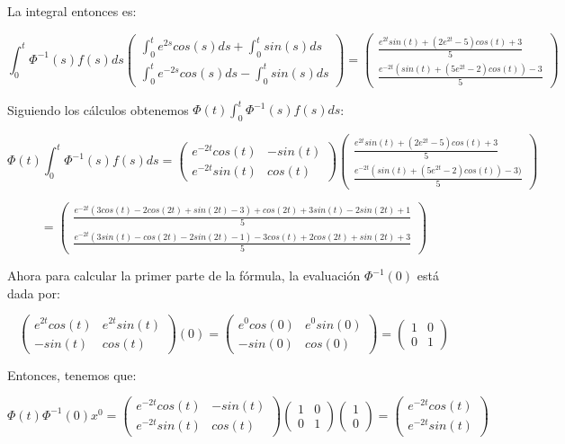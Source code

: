La integral entonces es: 

$$ \int^{t}_{0} \Phi^{-1}(s)f(s) ds \begin{pmatrix}
\int^{t}_{0} e^{2s} cos(s) ds + \int^{t}_{0} sin(s) ds\\
\int^{t}_{0} e^{-2s} cos(s) ds - \int^{t}_{0} sin(s) ds
\end{pmatrix}= 
\begin{pmatrix}
\frac{e^{2t} sin(t)+ (2e^{2t}-5) cos(t)+3}{5}\\
\frac{e^{-2t}(sin(t)+ (5e^{2t}-2)cos(t))-3}{5}
\end{pmatrix}$$

Siguiendo los cálculos obtenemos $\Phi(t) \int^{t}_{0} \Phi^{-1}(s) f(s) ds$: 

$$ \Phi(t) \int^{t}_{0} \Phi^{-1}(s) f(s) ds= \begin{pmatrix}
e^{-2t}cos(t) & -sin(t)\\
e^{-2t}sin(t) & cos(t)
\end{pmatrix}
\begin{pmatrix}
\frac{e^{2t}sin(t)+ (2e^{2t}-5)cos(t)+3}{5}\\
\frac{e^{-2t}(sin(t)+(5e^{2t}-2)cos(t))-3)}{5}
\end{pmatrix}$$

$$=\begin{pmatrix}
\frac{e^{-2t}(3cos(t)-2cos(2t)+sin(2t)-3)+cos(2t)+3sin(t)-2sin(2t)+1}{5}\\
\frac{e^{-2t}(3sin(t)-cos(2t)-2sin(2t)-1)-3cos(t)+2cos(2t)+sin(2t)+3}{5}
\end{pmatrix}$$

Ahora para calcular la primer parte de la fórmula, la evaluación $\Phi^{-1}(0)$ está dada por: 

$$\begin{pmatrix}
e^{2t}cos(t) & e^{2t}sin(t)\\
-sin(t) & cos(t)
\end{pmatrix}(0)=
\begin{pmatrix}
e^{0}cos(0) & e^{0}sin(0)\\
-sin(0) & cos(0)
\end{pmatrix}=
\begin{pmatrix}
1 & 0\\
0 & 1
\end{pmatrix}$$

Entonces, tenemos que: 

$$\Phi(t) \Phi^{-1}(0) x^0 =\begin{pmatrix}
e^{-2t}cos(t) & -sin(t)\\
e^{-2t}sin(t) & cos(t)
\end{pmatrix}
\begin{pmatrix}
1 & 0\\
0 & 1
\end{pmatrix}
\begin{pmatrix}
1\\
0
\end{pmatrix}=
\begin{pmatrix}
e^{-2t}cos(t)\\
e^{-2t}sin(t)
\end{pmatrix}$$

